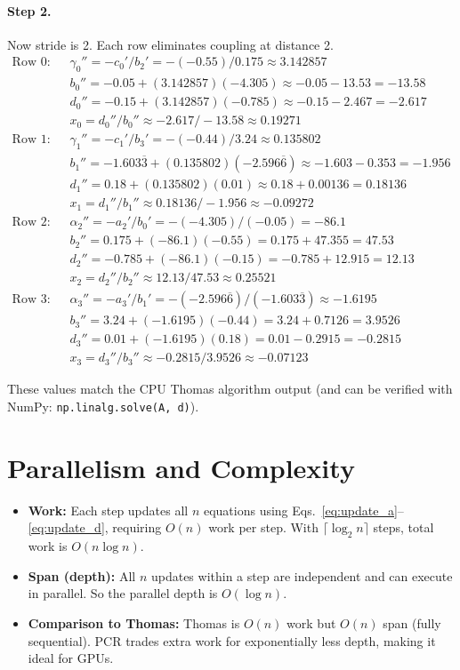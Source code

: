 \documentclass[11pt]{article}
\begin{document}
\paragraph{Step 2.}
Now stride is 2. Each row eliminates coupling at distance 2.
\begin{align*}
\text{Row 0:}\quad & \gamma_0'' = -c_0'/b_2' = -(-0.55)/0.175 \approx 3.142857 \\
& b_0'' = -0.05 + (3.142857)(-4.305) \approx -0.05 - 13.53 = -13.58 \\
& d_0'' = -0.15 + (3.142857)(-0.785) \approx -0.15 - 2.467 = -2.617 \\
& x_0 = d_0''/b_0'' \approx -2.617 / -13.58 \approx 0.19271 \\[6pt]
\text{Row 1:}\quad & \gamma_1'' = -c_1'/b_3' = -(-0.44)/3.24 \approx 0.135802 \\
& b_1'' = -1.603\overline{3} + (0.135802)(-2.596\overline{6}) \approx -1.603 - 0.353 = -1.956 \\
& d_1'' = 0.18 + (0.135802)(0.01) \approx 0.18 + 0.00136 = 0.18136 \\
& x_1 = d_1''/b_1'' \approx 0.18136 / -1.956 \approx -0.09272 \\[6pt]
\text{Row 2:}\quad & \alpha_2'' = -a_2'/b_0' = -(-4.305)/(-0.05) = -86.1 \\
& b_2'' = 0.175 + (-86.1)(-0.55) = 0.175 + 47.355 = 47.53 \\
& d_2'' = -0.785 + (-86.1)(-0.15) = -0.785 + 12.915 = 12.13 \\
& x_2 = d_2''/b_2'' \approx 12.13/47.53 \approx 0.25521 \\[6pt]
\text{Row 3:}\quad & \alpha_3'' = -a_3'/b_1' = -(-2.596\overline{6})/(-1.603\overline{3}) \approx -1.6195 \\
& b_3'' = 3.24 + (-1.6195)(-0.44) = 3.24 + 0.7126 = 3.9526 \\
& d_3'' = 0.01 + (-1.6195)(0.18) = 0.01 - 0.2915 = -0.2815 \\
& x_3 = d_3''/b_3'' \approx -0.2815/3.9526 \approx -0.07123
\end{align*}

These values match the CPU Thomas algorithm output (and can be verified with
NumPy: \texttt{np.linalg.solve(A, d)}).

\section{Parallelism and Complexity}

\begin{itemize}
\item \textbf{Work:} Each step updates all $n$ equations using
  Eqs.~\eqref{eq:update_a}--\eqref{eq:update_d}, requiring $O(n)$ work per step.
  With $\lceil \log_2 n \rceil$ steps, total work is $O(n \log n)$.
\item \textbf{Span (depth):} All $n$ updates within a step are independent
  and can execute in parallel. So the parallel depth is $O(\log n)$.
\item \textbf{Comparison to Thomas:} Thomas is $O(n)$ work but $O(n)$ span
  (fully sequential). PCR trades extra work for exponentially less depth,
  making it ideal for GPUs.
\end{itemize}
\end{document}
